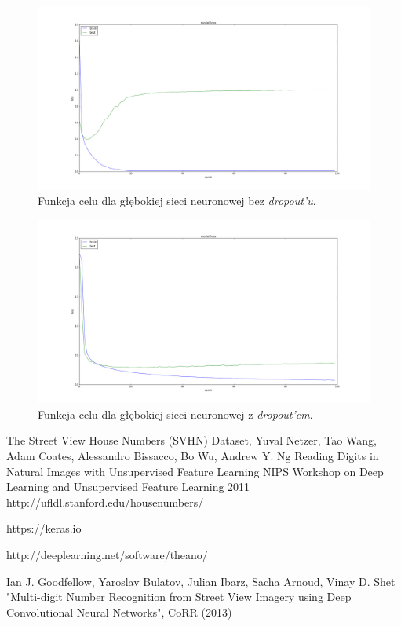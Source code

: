 \documentclass[12pt]{article}
\begin{document}
\begin{figure}[!ht]
\centering
\includegraphics[scale=0.25]{loss_no_dropout}
\caption{Funkcja celu dla głębokiej sieci neuronowej bez \textit{dropout'u}.}
\label{loss_no_dropout}
\end{figure}

\begin{figure}[!ht]
\centering
\includegraphics[scale=0.25]{loss_dropout}
\caption{Funkcja celu dla głębokiej sieci neuronowej z \textit{dropout'em}.}
\label{loss_dropout}
\end{figure}

\begin{thebibliography}{9}

The Street View House Numbers (SVHN) Dataset,
Yuval Netzer, Tao Wang, Adam Coates, Alessandro Bissacco, Bo Wu, Andrew Y. Ng
Reading Digits in Natural Images with Unsupervised Feature Learning NIPS Workshop on Deep Learning and Unsupervised Feature Learning
2011
http://ufldl.stanford.edu/housenumbers/

https://keras.io

http://deeplearning.net/software/theano/

Ian J. Goodfellow, Yaroslav Bulatov, Julian Ibarz, Sacha Arnoud, Vinay D. Shet
"Multi-digit Number Recognition from Street View Imagery using Deep Convolutional Neural Networks",
CoRR (2013)


\end{thebibliography}
\end{document}
